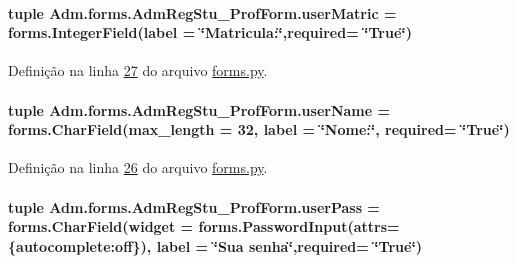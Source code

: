 \paragraph[{user\+Matric}]{\setlength{\rightskip}{0pt plus 5cm}tuple Adm.\+forms.\+Adm\+Reg\+Stu\+\_\+\+Prof\+Form.\+user\+Matric = forms.\+Integer\+Field(label = \char`\"{}Matricula\+:\char`\"{},required= \char`\"{}True\char`\"{})\hspace{0.3cm}{\ttfamily [static]}}\label{classAdm_1_1forms_1_1AdmRegStu__ProfForm_a8cd50b9437effd2fecd6e4c66c307e41}


Definição na linha \hyperlink{Adm_2forms_8py_source_l00027}{27} do arquivo \hyperlink{Adm_2forms_8py_source}{forms.\+py}.

\hypertarget{classAdm_1_1forms_1_1AdmRegStu__ProfForm_a4e5391112a173e2d304e20c2cc8bca4d}{}
\paragraph[{user\+Name}]{\setlength{\rightskip}{0pt plus 5cm}tuple Adm.\+forms.\+Adm\+Reg\+Stu\+\_\+\+Prof\+Form.\+user\+Name = forms.\+Char\+Field(max\+\_\+length = 32, label = \char`\"{}Nome\+:\char`\"{}, required= \char`\"{}True\char`\"{})\hspace{0.3cm}{\ttfamily [static]}}\label{classAdm_1_1forms_1_1AdmRegStu__ProfForm_a4e5391112a173e2d304e20c2cc8bca4d}


Definição na linha \hyperlink{Adm_2forms_8py_source_l00026}{26} do arquivo \hyperlink{Adm_2forms_8py_source}{forms.\+py}.

\hypertarget{classAdm_1_1forms_1_1AdmRegStu__ProfForm_ad50fce73918c911541bd1c385d25eeca}{}
\paragraph[{user\+Pass}]{\setlength{\rightskip}{0pt plus 5cm}tuple Adm.\+forms.\+Adm\+Reg\+Stu\+\_\+\+Prof\+Form.\+user\+Pass = forms.\+Char\+Field(widget = forms.\+Password\+Input(attrs=\{\textquotesingle{}autocomplete\textquotesingle{}\+:\textquotesingle{}off\textquotesingle{}\}), label = \char`\"{}Sua senha\char`\"{},required= \char`\"{}True\char`\"{})\hspace{0.3cm}{\ttfamily [static]}}\label{classAdm_1_1forms_1_1AdmRegStu__ProfForm_ad50fce73918c911541bd1c385d25eeca}


